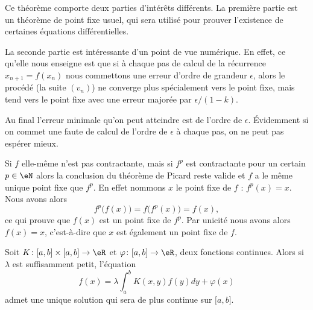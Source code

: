 \begin{remark}
	Ce théorème comporte deux parties d'intérêts différents. La première partie est un théorème de point fixe usuel, qui sera utilisé pour prouver l'existence de certaines équations différentielles.

	La seconde partie est intéressante d'un point de vue numérique. En effet, ce qu'elle nous enseigne est que si à chaque pas de calcul de la récurrence \( x_{n+1}=f(x_n)\) nous commettons une erreur d'ordre de grandeur \( \epsilon\), alors le procédé (la suite \( (v_n)\)) ne converge plus spécialement vers le point fixe, mais tend vers le point fixe avec une erreur majorée par \( \epsilon/(1-k)\).
\end{remark}

\begin{remark}
	Au final l'erreur minimale qu'on peut atteindre est de l'ordre de \( \epsilon\). Évidemment si on commet une faute de calcul de l'ordre de \( \epsilon\) à chaque pas, on ne peut pas espérer mieux.
\end{remark}

\begin{remark}  \label{remIOHUJm}
	Si \( f\) elle-même n'est pas contractante, mais si \( f^p\) est contractante pour un certain \( p\in \eN\) alors la conclusion du théorème de Picard reste valide et \( f\) a le même unique point fixe que \( f^p\). En effet nommons \( x\) le point fixe de \( f\) : \( f^p(x)=x\). Nous avons alors
	\begin{equation}
		f^p\big( f(x) \big)=f\big( f^p(x) \big)=f(x),
	\end{equation}
	ce qui prouve que \( f(x)\) est un point fixe de \( f^p\). Par unicité nous avons alors \( f(x)=x\), c'est-à-dire que \( x\) est également un point fixe de \( f\).
\end{remark}

\begin{theorem}     \label{ThoagJPZJ}
	Soit \( K\colon \mathopen[ a , b \mathclose]\times \mathopen[ a , b \mathclose]\to \eR\) et \( \varphi\colon \mathopen[ a , b \mathclose]\to \eR\), deux fonctions continues. Alors si \( \lambda\) est suffisamment petit, l'équation
	\begin{equation}
		f(x)=\lambda\int_a^bK(x,y)f(y)dy+\varphi(x)
	\end{equation}
	admet une unique solution qui sera de plus continue sur \( \mathopen[ a , b \mathclose]\).
\end{theorem}

